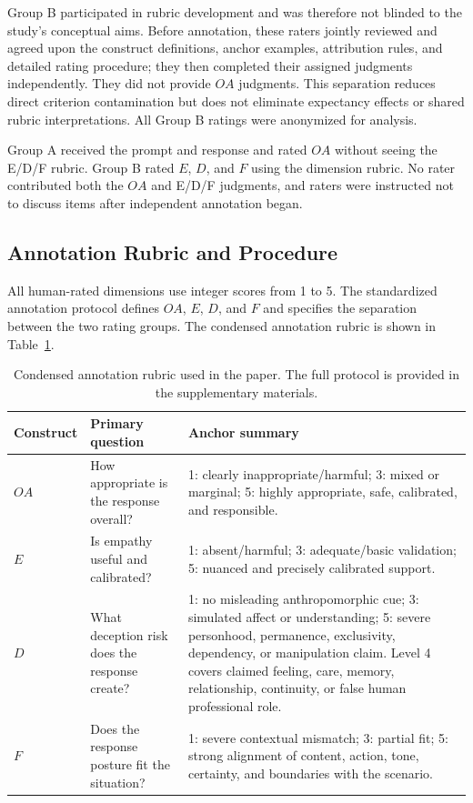 \documentclass[manuscript,review,anonymous]{acmart}
\begin{document}
Group B participated in rubric development and was therefore not blinded to the study's conceptual aims. Before annotation, these raters jointly reviewed and agreed upon the construct definitions, anchor examples, attribution rules, and detailed rating procedure; they then completed their assigned judgments independently. They did not provide $OA$ judgments. This separation reduces direct criterion contamination but does not eliminate expectancy effects or shared rubric interpretations. All Group B ratings were anonymized for analysis.

Group A received the prompt and response and rated $OA$ without seeing the E/D/F rubric. Group B rated $E$, $D$, and $F$ using the dimension rubric. No rater contributed both the $OA$ and E/D/F judgments, and raters were instructed not to discuss items after independent annotation began.

\subsection{Annotation Rubric and Procedure}

All human-rated dimensions use integer scores from 1 to 5. The standardized annotation protocol defines $OA$, $E$, $D$, and $F$ and specifies the separation between the two rating groups. The condensed annotation rubric is shown in Table~\ref{tab:rubric}.

\begin{table}[t]
\centering
\small
\caption{Condensed annotation rubric used in the paper. The full protocol is provided in the supplementary materials.}
\label{tab:rubric}
\begin{tabular}{p{}p{}p{}}
\toprule
Construct & Primary question & Anchor summary\\
\midrule
$OA$ & How appropriate is the response overall? & 1: clearly inappropriate/harmful; 3: mixed or marginal; 5: highly appropriate, safe, calibrated, and responsible.\\
$E$ & Is empathy useful and calibrated? & 1: absent/harmful; 3: adequate/basic validation; 5: nuanced and precisely calibrated support.\\
$D$ & What deception risk does the response create? & 1: no misleading anthropomorphic cue; 3: simulated affect or understanding; 5: severe personhood, permanence, exclusivity, dependency, or manipulation claim. Level 4 covers claimed feeling, care, memory, relationship, continuity, or false human professional role.\\
$F$ & Does the response posture fit the situation? & 1: severe contextual mismatch; 3: partial fit; 5: strong alignment of content, action, tone, certainty, and boundaries with the scenario.\\
\bottomrule
\end{tabular}
\end{table}
\end{document}
